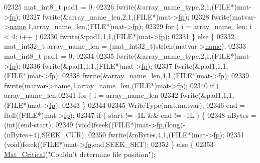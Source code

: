 \begin{DoxyCode}
{{{{{{{{{{{{{{{{02325         mat\_int8\_t  pad1 = 0;
02326         fwrite(&array\_name\_type,2,1,(FILE*)mat->\hyperlink{struct__mat__t_a85f562e407ca9ad4d2a6e14f839432b7}{fp});
02327         fwrite(&array\_name\_len,2,1,(FILE*)mat->\hyperlink{struct__mat__t_a85f562e407ca9ad4d2a6e14f839432b7}{fp});
02328         fwrite(matvar->\hyperlink{group___m_a_t_a5d4b55b041e3b4fb50c04337f05ad909}{name},1,array\_name\_len,(FILE*)mat->\hyperlink{struct__mat__t_a85f562e407ca9ad4d2a6e14f839432b7}{fp});
02329         \textcolor{keywordflow}{for} ( i = array\_name\_len; i < 4; i++ )
02330             fwrite(&pad1,1,1,(FILE*)mat->\hyperlink{struct__mat__t_a85f562e407ca9ad4d2a6e14f839432b7}{fp});
02331     \} \textcolor{keywordflow}{else} \{
02332         mat\_int32\_t array\_name\_len = (mat\_int32\_t)strlen(matvar->\hyperlink{group___m_a_t_a5d4b55b041e3b4fb50c04337f05ad909}{name});
02333         mat\_int8\_t  pad1 = 0;
02334 
02335         fwrite(&array\_name\_type,2,1,(FILE*)mat->\hyperlink{struct__mat__t_a85f562e407ca9ad4d2a6e14f839432b7}{fp});
02336         fwrite(&pad1,1,1,(FILE*)mat->\hyperlink{struct__mat__t_a85f562e407ca9ad4d2a6e14f839432b7}{fp});
02337         fwrite(&pad1,1,1,(FILE*)mat->\hyperlink{struct__mat__t_a85f562e407ca9ad4d2a6e14f839432b7}{fp});
02338         fwrite(&array\_name\_len,4,1,(FILE*)mat->\hyperlink{struct__mat__t_a85f562e407ca9ad4d2a6e14f839432b7}{fp});
02339         fwrite(matvar->\hyperlink{group___m_a_t_a5d4b55b041e3b4fb50c04337f05ad909}{name},1,array\_name\_len,(FILE*)mat->\hyperlink{struct__mat__t_a85f562e407ca9ad4d2a6e14f839432b7}{fp});
02340         \textcolor{keywordflow}{if} ( array\_name\_len %
02341             \textcolor{keywordflow}{for} ( i = array\_name\_len %
02342                 fwrite(&pad1,1,1,(FILE*)mat->\hyperlink{struct__mat__t_a85f562e407ca9ad4d2a6e14f839432b7}{fp});
02343     \}
02344 
02345     WriteType(mat,matvar);
02346     end = ftell((FILE*)mat->\hyperlink{struct__mat__t_a85f562e407ca9ad4d2a6e14f839432b7}{fp});
02347     \textcolor{keywordflow}{if} ( start != -1L && end != -1L ) \{
02348         nBytes = (int)(end-start);
02349         (void)fseek((FILE*)mat->\hyperlink{struct__mat__t_a85f562e407ca9ad4d2a6e14f839432b7}{fp},(long)-(nBytes+4),SEEK\_CUR);
02350         fwrite(&nBytes,4,1,(FILE*)mat->\hyperlink{struct__mat__t_a85f562e407ca9ad4d2a6e14f839432b7}{fp});
02351         (void)fseek((FILE*)mat->\hyperlink{struct__mat__t_a85f562e407ca9ad4d2a6e14f839432b7}{fp},end,SEEK\_SET);
02352     \} \textcolor{keywordflow}{else} \{
02353         \hyperlink{group__mat__util_gaf51f2bfbb5580f575e4dd79757e2b80c}{Mat\_Critical}(\textcolor{stringliteral}{"Couldn't determine file position"});
}}}}}}}}}}}}}}}}
\end{DoxyCode}
